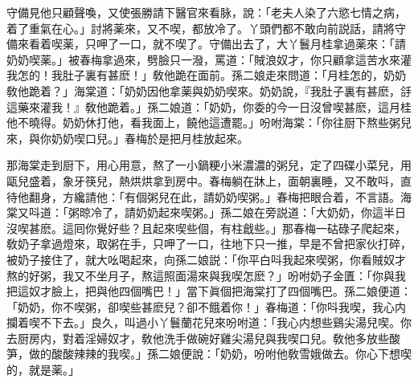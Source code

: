 守備見他只顧聲喚，又使張勝請下醫官來看脉，說：「老夫人染了六慾七情之病，着了重氣在心。」討將薬來，又不喫，都放冷了。丫頭們都不敢向前説話，請將守備來看着喫薬，只呷了一口，就不喫了。守備出去了，大丫鬟月桂拿過薬來：「請奶奶喫薬。」被春梅拿過來，劈臉只一潑，罵道：「賊浪奴才，你只顧拿這苦水來灌我怎的！我肚子裏有甚麽！」敎他跪在面前。孫二娘走來問道：「月桂怎的，奶奶敎他跪着？」海棠道：「奶奶因他拿薬與奶奶喫來。奶奶說，『我肚子裏有甚麽，㧱這藥來灌我！』敎他跪着。」孫二娘道：「奶奶，你委的今一日沒曾喫甚麽，這月桂他不曉得。奶奶休打他，看我面上，饒他這遭罷。」吩咐海棠：「你往厨下熬些粥兒來，與你奶奶喫口兒。」春梅於是把月桂放起來。

那海棠走到厨下，用心用意，熬了一小鍋粳小米濃濃的粥兒，定了四碟小菜兒，用甌兒盛着，象牙筷兒，熱烘烘拿到房中。春梅躺在牀上，面朝裏睡，又不敢呌，直待他翻身，方纔請他：「有個粥兒在此，請奶奶喫粥。」春梅把眼合着，不言語。海棠又呌道：「粥晾冷了，請奶奶起來喫粥。」孫二娘在旁説道：「大奶奶，你這半日沒喫甚麽。這囘你覺好些？且起來喫些個，有柱戧些。」那春梅一𥑮碌子爬起來，敎奶子拿過燈來，取粥在手，只呷了一口，往地下只一推，早是不曾把家伙打碎，被奶子接住了，就大吆喝起來，向孫二娘説：「你平白呌我起來喫粥，你看賊奴才熬的好粥，我又不坐月子，熬這照面湯來與我喫怎麽？」吩咐奶子金匱：「你與我把這奴才臉上，把與他四個嘴巴！」當下眞個把海棠打了四個嘴巴。孫二娘便道：「奶奶，你不喫粥，卻喫些甚麽兒？卻不餓着你！」春梅道：「你呌我喫，我心内攔着喫不下去。」良久，叫過小丫鬟蘭花兒來吩咐道：「我心内想些鷄尖湯兒喫。你去厨房内，對着淫婦奴才，敎他洗手做碗好雞尖湯兒與我喫口兒。敎他多放些酸笋，做的酸酸辣辣的我喫。」孫二娘便說：「奶奶，吩咐他敎雪娥做去。你心下想喫的，就是薬。」

